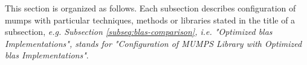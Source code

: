 This section is organized as follows. Each subsection describes configuration of \acrshort{mumps} with particular techniques, methods or libraries stated in the title of a subsection, \textit{e.g. Subsection \ref{subseq:blas-comparison}, i.e. 
"Optimized \acrshort{blas} Implementations", stands for 
"Configuration of MUMPS Library with Optimized \acrshort{blas} Implementations"}.\\